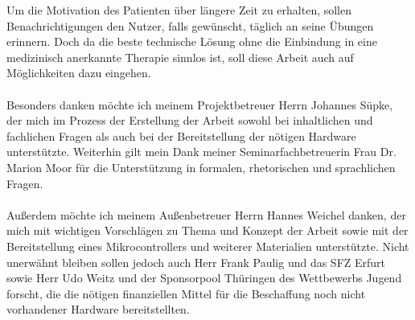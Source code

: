 Um die Motivation des Patienten über längere Zeit zu erhalten, sollen Benachrichtigungen den Nutzer, falls gewünscht, täglich an seine Übungen erinnern. Doch da die beste technische Lösung ohne die Einbindung in eine medizinisch anerkannte Therapie sinnlos ist, soll diese Arbeit auch auf Möglichkeiten dazu eingehen. \\ \\
Besonders danken möchte ich meinem Projektbetreuer Herrn Johannes Süpke, der mich im Prozess der Erstellung der Arbeit sowohl bei inhaltlichen und fachlichen Fragen als auch bei der Bereitstellung der nötigen Hardware unterstützte. Weiterhin gilt mein Dank meiner Seminarfachbetreuerin Frau Dr. Marion Moor für die Unterstützung in formalen, rhetorischen und sprachlichen Fragen. \\ \\
Außerdem möchte ich meinem Außenbetreuer Herrn Hannes Weichel danken, der mich mit wichtigen Vorschlägen zu Thema und Konzept der Arbeit sowie mit der Bereitstellung eines Mikrocontrollers und weiterer Materialien unterstützte. Nicht unerwähnt bleiben sollen jedoch auch Herr Frank Paulig und das SFZ Erfurt sowie Herr Udo Weitz und der Sponsorpool Thüringen des Wettbewerbs \glqq Jugend forscht\grqq , die die nötigen finanziellen Mittel für die Beschaffung noch nicht vorhandener Hardware bereitstellten.